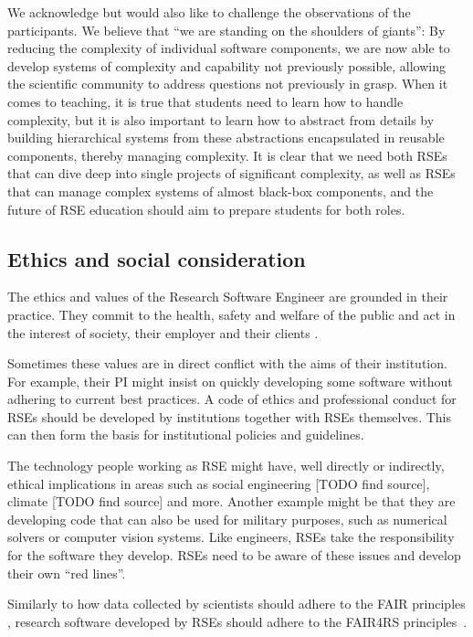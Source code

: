 \documentclass{eceasst}
\begin{document}
We acknowledge but would also like to challenge the observations of the participants.
We believe that ``we are standing on the shoulders of giants'':
By reducing the complexity of individual software components,
we are now able to develop systems of complexity and capability not previously possible,
allowing the scientific community to address questions not previously in grasp.
When it comes to teaching, it is true that students need to learn how to handle complexity,
but it is also important to learn how to abstract from details
by building hierarchical systems from these abstractions encapsulated in reusable components, thereby managing complexity.
It is clear that we need both RSEs that can dive deep into single projects of significant complexity,
as well as RSEs that can manage complex systems of almost black-box components,
and the future of RSE education should aim to prepare students for both roles.

\subsection{Ethics and social consideration}

The ethics and values of the Research Software Engineer are grounded in their practice.
They commit to the health, safety and welfare of the public and act in the interest of society, their employer and their clients \cite{Goth2023}.

Sometimes these values are in direct conflict with the aims of their institution. For example, their PI might insist on quickly developing some software without adhering to current best practices.
A code of ethics and professional conduct for RSEs should be developed by institutions together with RSEs themselves. This can then form the basis for institutional policies and guidelines.

The technology people working as RSE might have, well directly or indirectly, ethical implications in areas such as social engineering [TODO find source], climate [TODO find source] and more.
Another example might be that they are developing code that can also be used for military purposes, such as numerical solvers or computer vision systems.
Like engineers, RSEs take the responsibility for the software they develop.
RSEs need to be aware of these issues and develop their own ``red lines''.

Similarly to how data collected by scientists should adhere to the FAIR principles \cite{FAIR}, research software developed by RSEs should adhere to the FAIR4RS principles~\cite{FAIR4RS}.
\end{document}
